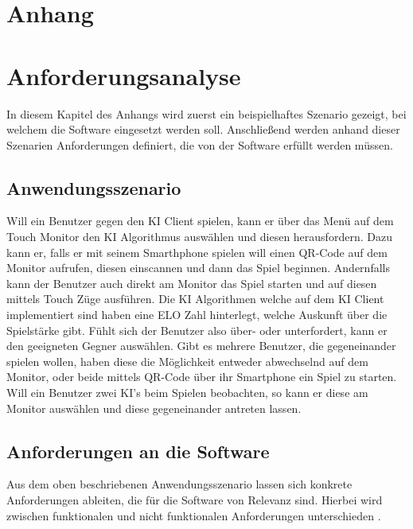 \documentclass[12pt,a4paper,bibliography=totocnumbered,listof=totocnumbered]{article}
\begin{document}
\begin{appendix}
\section*{Anhang}
{}

\section{Anforderungsanalyse}
\label{apx:Anforderungsanalyse}
In diesem Kapitel des Anhangs wird zuerst ein beispielhaftes Szenario gezeigt, bei welchem die Software eingesetzt werden soll.
Anschließend werden anhand dieser Szenarien Anforderungen definiert, die von der Software erfüllt werden müssen.
\subsection{Anwendungsszenario}
Will ein Benutzer gegen den KI Client spielen, kann er über das Menü auf dem Touch Monitor den KI Algorithmus auswählen und diesen herausfordern.
Dazu kann er, falls er mit seinem Smarthphone spielen will einen QR-Code auf dem Monitor aufrufen, diesen einscannen und dann das Spiel beginnen.
Andernfalls kann der Benutzer auch direkt am Monitor das Spiel starten und auf diesen mittels Touch Züge ausführen.
Die KI Algorithmen welche auf dem KI Client implementiert sind haben eine ELO Zahl hinterlegt, welche Auskunft über die Spielstärke gibt.
Fühlt sich der Benutzer also über- oder unterfordert, kann er den geeigneten Gegner auswählen. Gibt es mehrere Benutzer, die 
gegeneinander spielen wollen, haben diese die Möglichkeit entweder abwechselnd auf dem Monitor, oder beide mittels QR-Code über ihr Smartphone ein Spiel zu starten.
Will ein Benutzer zwei KI's beim Spielen beobachten, so kann er diese am Monitor auswählen und diese gegeneinander antreten lassen.
\subsection{Anforderungen an die Software}
Aus dem oben beschriebenen Anwendungsszenario lassen sich konkrete Anforderungen ableiten, die für die Software von Relevanz sind.
Hierbei wird zwischen funktionalen und nicht funktionalen Anforderungen unterschieden \cite{RequirementEngenieering}.

\end{appendix}
\end{document}

